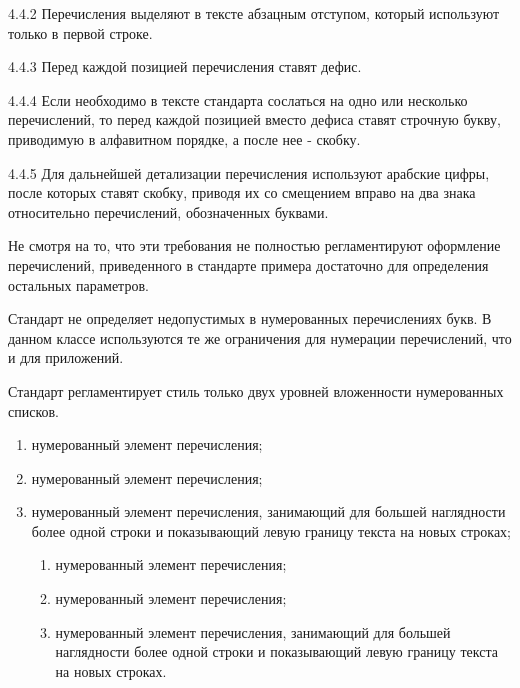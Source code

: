\documentclass[12pt, twoside, final]{ruost}
\begin{document}
\begin{OST}
					\begin{stdquote}
						\par 4.4.2 Перечисления выделяют в тексте абзацным отступом, который используют только в первой строке.
						\par 4.4.3 Перед каждой позицией перечисления ставят дефис.
						\par 4.4.4 Если необходимо в тексте стандарта сослаться на одно или несколько перечислений, то перед каждой позицией вместо дефиса ставят строчную букву, приводимую в алфавитном порядке, а после нее - скобку.
						\par 4.4.5 Для дальнейшей детализации перечисления используют арабские цифры, после которых ставят скобку, приводя их со смещением вправо на два знака относительно перечислений, обозначенных буквами.
						\par [ГОСТ 1.5---2001]
					\end{stdquote}
					\begin{notes}
						\item Не смотря на то, что эти требования не полностью регламентируют оформление перечислений, приведенного в стандарте примера достаточно для определения остальных параметров.
						\item Стандарт не определяет недопустимых в нумерованных перечислениях букв. В данном классе используются те же ограничения для нумерации перечислений, что и для приложений.
					\end{notes}
				
				\point Стандарт регламентирует стиль только двух уровней вложенности нумерованных списков.
				
				\begin{enumerate}
					\item нумерованный элемент перечисления;
					\item нумерованный элемент перечисления;
					\item нумерованный элемент перечисления, занимающий для большей наглядности более одной строки и показывающий левую границу текста на новых строках;
					\begin{enumerate}
						\item нумерованный элемент перечисления;
						\item нумерованный элемент перечисления;
						\item нумерованный элемент перечисления, занимающий для большей наглядности более одной строки и показывающий левую границу текста на новых строках.
					\end{enumerate}
				\end{enumerate}
				

\end{OST}
\end{document}
